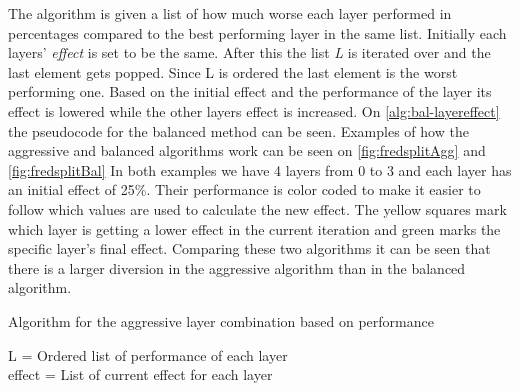 The algorithm is given a list of how much worse each layer performed in percentages compared to the best performing layer in the same list.
Initially each layers' \textit{effect} is set to be the same.
After this the list \textit{L} is iterated over and the last element gets popped.
Since L is ordered the last element is the worst performing one.
Based on the initial effect and the performance of the layer its effect is lowered while the other layers effect is increased.
On \autoref{alg:bal-layereffect} the pseudocode for the balanced method can be seen.
Examples of how the aggressive and balanced algorithms work can be seen on \autoref{fig:fredsplitAgg} and \autoref{fig:fredsplitBal}
In both examples we have 4 layers from 0 to 3 and each layer has an initial effect of 25\%.
Their performance is color coded to make it easier to follow which values are used to calculate the new effect.
The yellow squares mark which layer is getting a lower effect in the current iteration and green marks the specific layer's final effect.
Comparing these two algorithms it can be seen that there is a larger diversion in the aggressive algorithm than in the balanced algorithm.
\begin{algorithm}
    \caption{Algorithm for the aggressive layer combination based on performance}
    \SetAlgoLined
    L = Ordered list of performance of each layer \\
    effect  = List of current effect for each layer \\
    \label{alg:aggresive-layereffect}
\end{algorithm}

